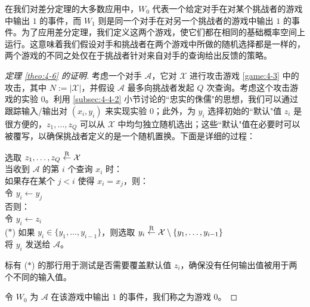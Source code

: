 在我们对差分定理的大多数应用中，$W_0$ 代表一个给定对手在对某个挑战者的游戏中输出 $1$ 的事件，而 $W_1$ 则是同一个对手在对另一个挑战者的游戏中输出 $1$ 的事件。为了应用差分定理，我们定义这两个游戏，使它们都在相同的基础概率空间上运行。这意味着我们假设对手和挑战者在两个游戏中所做的随机选择都是一样的，两个游戏的不同之处仅在于挑战者针对来自对手的查询给出反馈的策略。

\begin{proof}[定理 \ref{theo:4-6} 的证明]
考虑一个对手 $\mathcal{A}$，它对 $\mathcal{X}$ 进行攻击游戏 \ref{game:4-3} 中的攻击，其中 $N:=|\mathcal{X}|$，并假设 $\mathcal{A}$ 最多向挑战者发起 $Q$ 次查询。考虑这个攻击游戏的实验 $0$。利用 \ref{subsec:4-4-2} 小节讨论的``忠实的侏儒"的思想，我们可以通过跟踪输入/输出对 $(x_i,y_i)$ 来实现实验 $0$；此外，为 $y_i$ 选择初始的``默认"值 $z_i$ 是很方便的，$z_1,\dots,z_Q$ 可以从 $\mathcal{X}$ 中均匀独立随机选出；这些``默认"值在必要时可以被覆写，以确保挑战者定义的是一个随机置换。下面是详细的过程：

\vspace{10pt}

\hspace*{5pt} 选取 $z_1,\dots,z_Q\overset{\rm R}\leftarrow\mathcal{X}$\\
\hspace*{26pt} 当收到 $\mathcal{A}$ 的第 $i$ 个查询 $x_i$ 时：\\
\hspace*{50pt} 如果存在某个 $j<i$ 使得 $x_i=x_j$，则：\\
\hspace*{75pt} 令 $y_i\leftarrow y_j$\\
\hspace*{50pt} 否则：\\
\hspace*{75pt} 令 $y_i\leftarrow z_i$\\
\hspace*{1pt} ($*$)
\hspace*{53pt} 如果 $y_i\in\{y_1,\dots,y_{i-1}\}$，则选取 $y_i\overset{\rm R}\leftarrow\mathcal{X}\setminus\{y_1,\dots,y_{i-1}\}$\\
\hspace*{50pt} 将 $y_i$ 发送给 $\mathcal{A}$。

\vspace{10pt}

标有 ($*$) 的那行用于测试是否需要覆盖默认值 $z_i$，确保没有任何输出值被用于两个不同的输入值。

令 $W_0$ 为 $\mathcal{A}$ 在该游戏中输出 $1$ 的事件，我们称之为游戏 $0$。


\end{proof}
